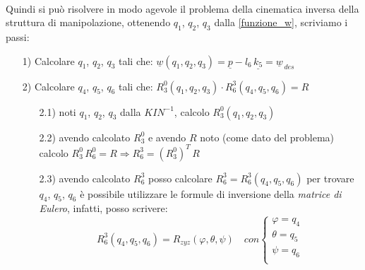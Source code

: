 \paragraph{}
Quindi si può risolvere in modo agevole il problema della cinematica inversa della struttura di manipolazione, ottenendo $q_1$, $q_2$, $q_3$ dalla \eqref{funzione_w}, scriviamo i passi:
\begin{enumerate}
	\item[1)] Calcolare $q_1$, $q_2$, $q_3$ tali che: $\underline{w}(q_1, q_2, q_3) = \underline{p} - l_6\,\underline{k_5} = \underline{w}_{\,des}$
	\item[2)] Calcolare $q_4$, $q_5$, $q_6$ tali che: $R_3^0(q_1, q_2, q_3) \cdot R_6^3(q_4, q_5, q_6) = R$
	\begin{enumerate}
		\item[2.1)] noti $q_1$, $q_2$, $q_3$ dalla $KIN^{-1}$, calcolo $R_3^0(q_1, q_2, q_3)$
		\item[2.2)] avendo calcolato $R_3^0$ e avendo $R$ noto (come dato del problema) calcolo $R_3^0\,R_6^0 = R \Rightarrow R_6^3 = (R_3^0)^T\,R$
		\item[2.3)] avendo calcolato $R_6^3$ posso calcolare $R_6^3 = R_6^3(q_4, q_5, q_6)$ per trovare $q_4$, $q_5$, $q_6$ è possibile utilizzare le formule di inversione della \emph{matrice di Eulero}, infatti, posso scrivere:
		\begin{equation}
			R_6^3(q_4, q_5, q_6) = R_{zyz}(\varphi, \theta, \psi) \quad con 
			\begin{cases}
				\varphi = q_4 \\
				\theta = q_5 \\
				\psi = q_6 \\
			\end{cases}
		\end{equation}
	\end{enumerate}
\end{enumerate}